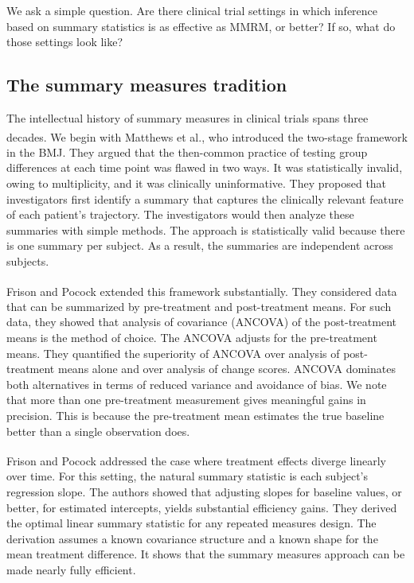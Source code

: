 \documentclass[
  11pt,
]{article}
\begin{document}
We ask a simple question. Are there clinical trial settings in
which inference based on summary statistics is as effective as
MMRM, or better? If so, what do those settings look like?

\subsection{The summary measures tradition}\label{the-summary-measures-tradition}

The intellectual history of summary measures in clinical trials
spans three decades. We begin with
Matthews et al.\textsuperscript{}, who introduced the
two-stage framework in the BMJ. They argued that the
then-common practice of testing group differences at each time
point was flawed in two ways. It was statistically invalid,
owing to multiplicity, and it was clinically uninformative.
They proposed that investigators first identify a summary that
captures the clinically relevant feature of each patient's
trajectory. The investigators would then analyze these
summaries with simple methods. The approach is statistically
valid because there is one summary per subject. As a result,
the summaries are independent across subjects.

Frison and Pocock\textsuperscript{} extended this
framework substantially. They considered data that can be summarized by
pre-treatment and post-treatment means. For such data, they showed that
analysis of covariance (ANCOVA) of the post-treatment means is the
method of choice. The ANCOVA adjusts for the pre-treatment means. They
quantified the superiority of ANCOVA over analysis of post-treatment
means alone and over analysis of change scores. ANCOVA dominates both
alternatives in terms of reduced variance and avoidance of bias. We note
that more than one pre-treatment measurement gives meaningful gains in
precision. This is because the pre-treatment mean estimates the true
baseline better than a single observation does.

Frison and Pocock\textsuperscript{} addressed the
case where treatment effects diverge linearly over time. For this
setting, the natural summary statistic is each subject's regression
slope. The authors showed that adjusting slopes for baseline values, or
better, for estimated intercepts, yields substantial efficiency gains.
They derived the optimal linear summary statistic for any repeated
measures design. The derivation assumes a known covariance structure and
a known shape for the mean treatment difference. It shows that the
summary measures approach can be made nearly fully efficient.
\end{document}

